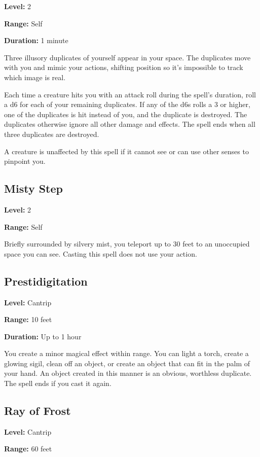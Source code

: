 \documentclass[12pt,letterpaper,twocolumn,openany,nodeprecatedcode,bg=none]{dndbook}
\let\oldsubsection\subsection
\renewcommand{\subsection}[1]{%
  \needspace{5\baselineskip}%
  \oldsubsection{#1}%
}
\begin{document}
\textbf{Level:} 2

\textbf{Range:} Self

\textbf{Duration:} 1 minute

Three illusory duplicates of yourself appear in your space. The
duplicates move with you and mimic your actions, shifting position so
it's impossible to track which image is real.

Each time a creature hits you with an attack roll during the spell's
duration, roll a d6 for each of your remaining duplicates. If any of the
d6s rolls a 3 or higher, one of the duplicates is hit instead of you,
and the duplicate is destroyed. The duplicates otherwise ignore all
other damage and effects. The spell ends when all three duplicates are
destroyed.

A creature is unaffected by this spell if it cannot see or can use other
senses to pinpoint you.

\subsection{Misty Step}\label{misty-step}

\textbf{Level:} 2

\textbf{Range:} Self

Briefly surrounded by silvery mist, you teleport up to 30 feet to an
unoccupied space you can see. Casting this spell does not use your
action.

\subsection{Prestidigitation}\label{prestidigitation}

\textbf{Level:} Cantrip

\textbf{Range:} 10 feet

\textbf{Duration:} Up to 1 hour

You create a minor magical effect within range. You can light a torch,
create a glowing sigil, clean off an object, or create an object that
can fit in the palm of your hand. An object created in this manner is an
obvious, worthless duplicate. The spell ends if you cast it again.

\subsection{Ray of Frost}\label{ray-of-frost}

\textbf{Level:} Cantrip

\textbf{Range:} 60 feet
\end{document}
